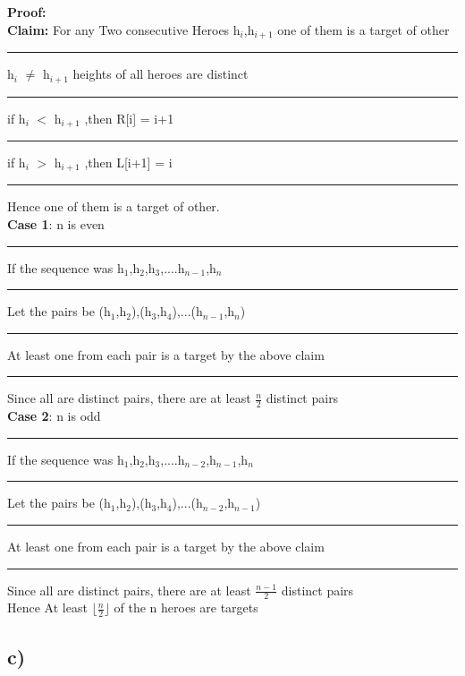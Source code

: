\documentclass{report}
\begin{document}
 \textbf{Proof:}\\
 \textbf{Claim:} For any Two consecutive Heroes h$_i$,h$_{i+1}$ one of them is a target of other\\
 \rule[0.5mm]{1.25cm}{0pt} h$_i$ $\neq$ h$_{i+1}$ heights of all heroes are distinct\\
 \rule[0.5mm]{1.25cm}{0pt} if h$_i$ $<$ h$_{i+1}$ ,then R[i] = i+1\\
 \rule[0.5mm]{1.25cm}{0pt} if h$_i$ $>$ h$_{i+1}$ ,then L[i+1] = i\\
 \rule[0.5mm]{1.25cm}{0pt} Hence one of them is a target of other.\\
 \textbf{Case 1}: n is even\\
 \rule[0.5mm]{1.25cm}{0pt} If the sequence was h$_1$,h$_2$,h$_3$,....h$_{n-1}$,h$_n$\\
 \rule[0.5mm]{1.25cm}{0pt} Let the pairs be (h$_1$,h$_2$),(h$_3$,h$_4$),...(h$_{n-1}$,h$_n$)\\
 \rule[0.5mm]{1.25cm}{0pt} At least one from each pair is a target by the above claim\\
 \rule[0.5mm]{1.25cm}{0pt} Since all are distinct pairs, there are at least $\frac{n}{2}$ distinct pairs\\
 \textbf{Case 2}: n is odd\\
 \rule[0.5mm]{1.25cm}{0pt} If the sequence was h$_1$,h$_2$,h$_3$,....h$_{n-2}$,h$_{n-1}$,h$_n$\\
 \rule[0.5mm]{1.25cm}{0pt} Let the pairs be (h$_1$,h$_2$),(h$_3$,h$_4$),...(h$_{n-2}$,h$_{n-1}$)\\
 \rule[0.5mm]{1.25cm}{0pt} At least one from each pair is a target by the above claim\\
 \rule[0.5mm]{1.25cm}{0pt} Since all are distinct pairs, there are at least $\frac{n-1}{2}$ distinct pairs\\
 Hence  At least $\lfloor\frac{n}{2}\rfloor$ of the n heroes are targets
 \subsection*{c)}
\end{document}
